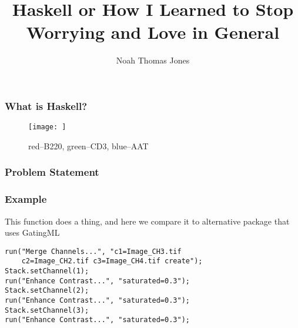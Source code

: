 \documentclass{beamer}
\title{Haskell or How I Learned to Stop Worrying and Love in General}
\author{Noah Thomas Jones}
\institute{University of Florida}
\date{}
\begin{document}
\frame{\titlepage}

\begin{frame}
  \frametitle{What is Haskell?}
  \begin{figure}
    \centering
    \texttt{[image: ]}
    \caption{red--B220, green--CD3, blue--AAT}
  \end{figure}
\end{frame}

\begin{frame}
  \frametitle{Problem Statement}
\end{frame}

\begin{frame}[fragile]
  \frametitle{Example}
  This function does a thing, and here we compare it to alternative package that uses GatingML
    \begin{verbatim}
run("Merge Channels...", "c1=Image_CH3.tif
    c2=Image_CH2.tif c3=Image_CH4.tif create");
Stack.setChannel(1);
run("Enhance Contrast...", "saturated=0.3");
Stack.setChannel(2);
run("Enhance Contrast...", "saturated=0.3");
Stack.setChannel(3);
run("Enhance Contrast...", "saturated=0.3");
    \end{verbatim}
\end{frame}


\nocite{*}


\end{document}
